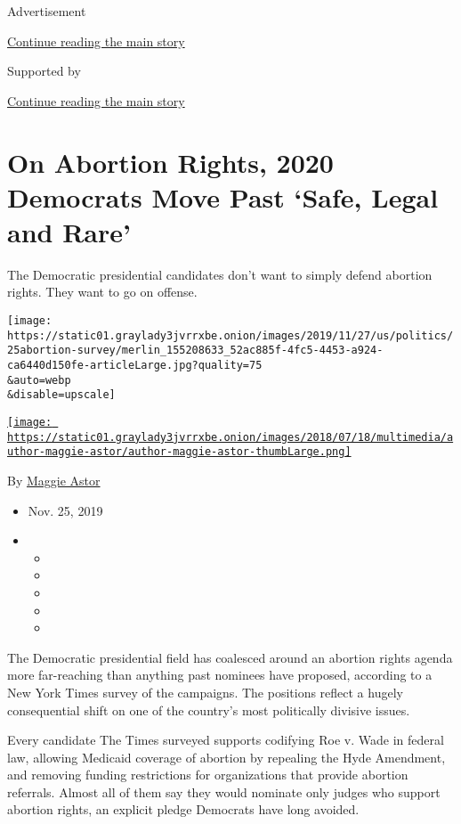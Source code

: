 Advertisement

\protect\hyperlink{after-top}{Continue reading the main story}

Supported by

\protect\hyperlink{after-sponsor}{Continue reading the main story}

\hypertarget{on-abortion-rights-2020-democrats-move-past-safe-legal-and-rare}{%
\section{On Abortion Rights, 2020 Democrats Move Past `Safe, Legal and
Rare'}\label{on-abortion-rights-2020-democrats-move-past-safe-legal-and-rare}}

The Democratic presidential candidates don't want to simply defend
abortion rights. They want to go on offense.

\texttt{[image: https://static01.graylady3jvrrxbe.onion/images/2019/11/27/us/politics/25abortion-survey/merlin\_155208633\_52ac885f-4fc5-4453-a924-ca6440d150fe-articleLarge.jpg?quality=75\\\&auto=webp\\\&disable=upscale]}

\href{https://www.nytimes3xbfgragh.onion/by/maggie-astor}{\texttt{[image: https://static01.graylady3jvrrxbe.onion/images/2018/07/18/multimedia/author-maggie-astor/author-maggie-astor-thumbLarge.png]}}

By \href{https://www.nytimes3xbfgragh.onion/by/maggie-astor}{Maggie
Astor}

\begin{itemize}
\item
  Nov. 25, 2019
\item
  \begin{itemize}
  \item
  \item
  \item
  \item
  \item
  \end{itemize}
\end{itemize}

The Democratic presidential field has coalesced around an abortion
rights agenda more far-reaching than anything past nominees have
proposed, according to a New York Times survey of the campaigns. The
positions reflect a hugely consequential shift on one of the country's
most politically divisive issues.

Every candidate The Times surveyed supports codifying Roe v. Wade in
federal law, allowing Medicaid coverage of abortion by repealing the
Hyde Amendment, and removing funding restrictions for organizations that
provide abortion referrals. Almost all of them say they would nominate
only judges who support abortion rights, an explicit pledge Democrats
have long avoided.

